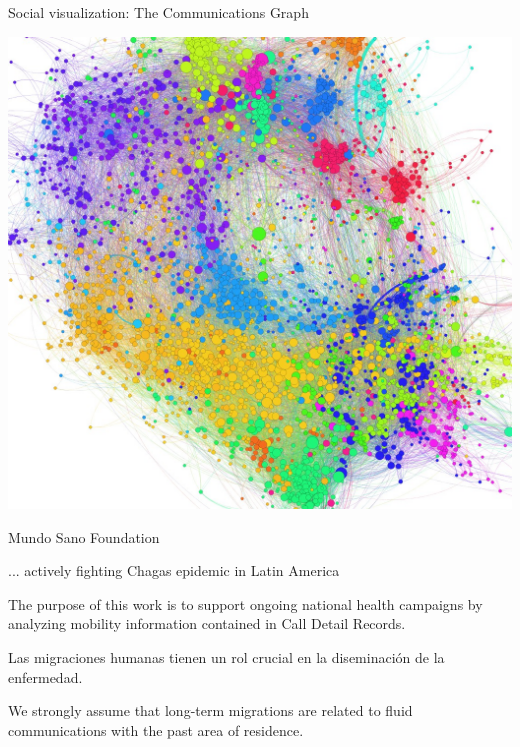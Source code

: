 \documentclass{beamer}
\begin{document}
\begin{frame}{Social visualization: The Communications Graph}
	
	\center
	\includegraphics[width = 1.0 \textwidth, trim = 0 0 0 0cm , clip = true]
	{slides/Graph-screenshot.jpg}
	
\end{frame}

\begin{frame}{Mundo Sano Foundation}
	\begin{block}{ ... actively fighting  Chagas epidemic in Latin America }

	The purpose of this work is to support ongoing national health campaigns 
	by analyzing mobility information contained in Call Detail Records.  
	
	\bigskip
	Las migraciones humanas tienen un rol crucial en la diseminación de la enfermedad.
	
%	
	\bigskip
	We strongly assume that long-term migrations are related to fluid communications with the past area of residence.
%	
%
	\end{block}
\end{frame}
\end{document}

